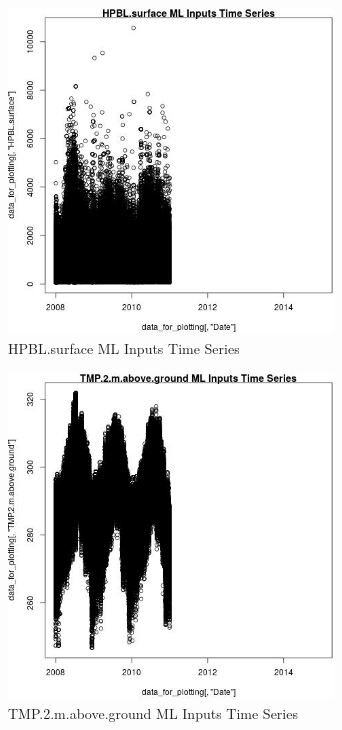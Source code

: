 \begin{figure} 
\centering  
\includegraphics[width=0.77\textwidth]{Code_Outputs/ML_input_report_ML_input_PM25_Step5_part_d_de_duplicated_aves_ML_input_HPBL.surfaceTS.jpg} 
\caption{\label{fig:ML_input_report_ML_input_PM25_Step5_part_d_de_duplicated_aves_ML_inputHPBL.surfaceTS}HPBL.surface ML Inputs Time Series} 
\end{figure} 
 

\begin{figure} 
\centering  
\includegraphics[width=0.77\textwidth]{Code_Outputs/ML_input_report_ML_input_PM25_Step5_part_d_de_duplicated_aves_ML_input_TMP.2.m.above.groundTS.jpg} 
\caption{\label{fig:ML_input_report_ML_input_PM25_Step5_part_d_de_duplicated_aves_ML_inputTMP.2.m.above.groundTS}TMP.2.m.above.ground ML Inputs Time Series} 
\end{figure} 
 

